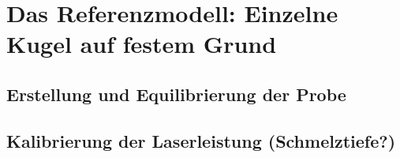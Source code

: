 \chapter{Das Referenzmodell: Einzelne Kugel auf festem Grund}



\section{Erstellung und Equilibrierung der Probe}

\section{Kalibrierung der Laserleistung (Schmelztiefe?)}

